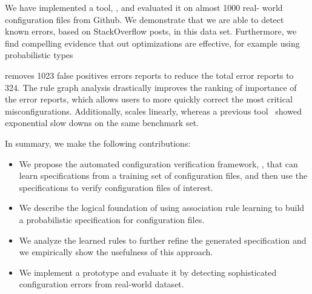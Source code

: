 We have implemented a tool, \app, and evaluated it on almost 1000 real-
world configuration files from Github.
We demonstrate that we are able to detect known errors, based on 
StackOverflow posts, in this data set.
Furthermore, we find compelling evidence that out optimizations are 
effective, for example using probabilistic types 

removes 1023 false 
positives errors reports to reduce the total error reports to 324.
The rule graph analysis drastically improves the ranking of importance of 
the error reports, which allows users to more quickly correct the most 
critical misconfigurations.
Additionally, \app scales linearly, whereas 
a previous tool~\cite{santolucitoCAV} showed exponential slow downs on 
the same benchmark set.

In summary, we make the following contributions:
\begin{itemize}
\item We propose the automated configuration verification
framework, \app, that can learn specifications from a training set
of configuration files, and then use the specifications to verify 
configuration files of interest.
\item We describe the logical foundation of using association rule learning to build a probabilistic specification for configuration files. 
\item We analyze the learned rules to further refine the generated specification and we empirically show the usefulness of this approach.
\item We implement a \app prototype and evaluate it by
detecting sophisticated configuration errors 
from real-world dataset.

\end{itemize}


